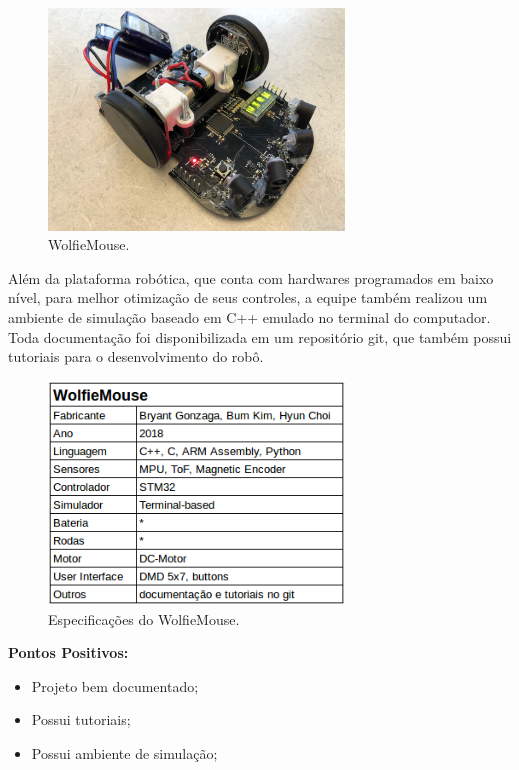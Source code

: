 \begin{figure}[H]
	\centering
	\includegraphics[width=0.7\textwidth]
	{Figures/WolfieMouse_model.jpg}
	\caption{\label{fig:WolfieMouse_model} WolfieMouse.}
\end{figure}

\hspace{0.5cm} Além da plataforma robótica, que conta com hardwares programados em baixo nível, para melhor otimização de seus controles, a equipe também realizou um ambiente de simulação baseado em C++ emulado no terminal do computador. Toda documentação foi disponibilizada em um repositório git, que também possui tutoriais para o desenvolvimento do robô.

\begin{figure}[H]
	\centering
	\includegraphics[width=0.7\textwidth]
	{Figures/WolfieMouse.png}
	\caption{\label{fig:WolfieMouse} Especificações do WolfieMouse.}
\end{figure}

\textbf{Pontos Positivos:}
\begin{itemize}
	\item Projeto bem documentado;
	\item Possui tutoriais;
	\item Possui ambiente de simulação;
\end{itemize}

